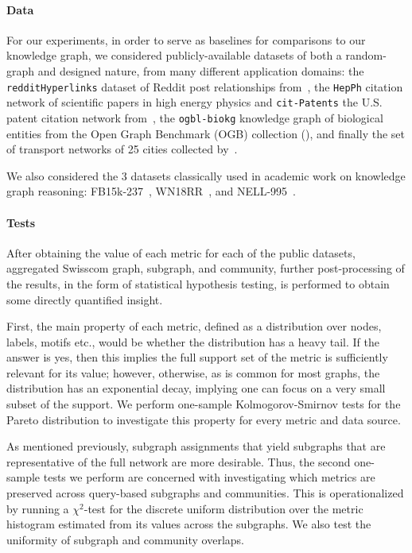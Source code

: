 \paragraph{Data} For our experiments, in order to serve as baselines for comparisons to our knowledge graph, we considered publicly-available datasets of both a random-graph and designed nature, from many different application domains: the \texttt{redditHyperlinks} dataset of Reddit post relationships from~\cite{kumar_community_2018}, the \texttt{HepPh} citation network of scientific papers in high energy physics and \texttt{cit-Patents} the U.S. patent citation network from~\cite{leskovec_graphs_2005}, the \texttt{ogbl-biokg} knowledge graph of biological entities from the Open Graph Benchmark (OGB) collection (\cite{hu_open_2021}), and finally the set of transport networks of 25 cities collected by~\cite{kujala_collection_2018}.

We also considered the 3 datasets classically used in academic work on knowledge graph reasoning: FB15k-237~\cite{toutanova_observed_2015}, WN18RR~\cite{dettmers_convolutional_2018}, and NELL-995~\cite{xiong_deeppath_2017}.

\paragraph{Tests} After obtaining the value of each metric for each of the public datasets, aggregated Swisscom graph, subgraph, and community, further post-processing of the results, in the form of statistical hypothesis testing, is performed to obtain some directly quantified insight.

First, the main property of each metric, defined as a distribution over nodes, labels, motifs etc., would be whether the distribution has a heavy tail. If the answer is yes, then this implies the full support set of the metric is sufficiently relevant for its value; however, otherwise, as is common for most graphs, the distribution has an exponential decay, implying one can focus on a very small subset of the support. We perform one-sample Kolmogorov-Smirnov tests for the Pareto distribution to investigate this property for every metric and data source.

As mentioned previously, subgraph assignments that yield subgraphs that are representative of the full network are more desirable. Thus, the second one-sample tests we perform are concerned with investigating which metrics are preserved across query-based subgraphs and communities. This is operationalized by running a $\chi^2$-test for the discrete uniform distribution over the metric histogram estimated from its values across the subgraphs. We also test the uniformity of subgraph and community overlaps.

